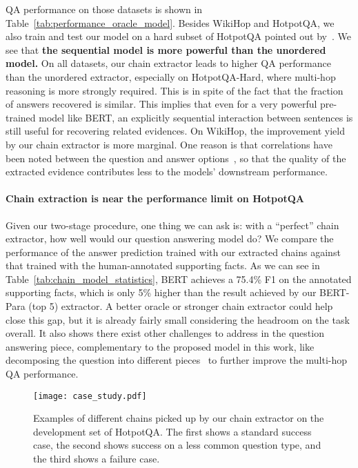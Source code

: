 \documentclass[11pt,a4paper]{article}
\begin{document}
QA performance on those datasets is shown in Table~\ref{tab:performance_oracle_model}. Besides WikiHop and HotpotQA, we also train and test our model on a hard subset of HotpotQA pointed out by~. We see that \textbf{the sequential model is more powerful than the unordered model.} On all datasets, our chain extractor leads to higher QA performance than the unordered extractor, especially on HotpotQA-Hard, where multi-hop reasoning is more strongly required. This is in spite of the fact that the fraction of answers recovered is similar. This implies that even for a very powerful pre-trained model like BERT, an explicitly sequential interaction between sentences is still useful for recovering related evidences. On WikiHop, the improvement yield by our chain extractor is more marginal. One reason is that correlations have been noted between the question and answer options~\citep{chen2019understanding}, so that the quality of the extracted evidence contributes less to the models' downstream performance. 










\paragraph{Chain extraction is near the performance limit on HotpotQA} Given our two-stage procedure, one thing we can ask is: with a ``perfect'' chain extractor, how well would our question answering model do? We compare the performance of the answer prediction trained with our extracted chains against that trained with the human-annotated supporting facts. As we can see in Table~\ref{tab:chain_model_statistics}, BERT achieves a 75.4\% F1 on the annotated supporting facts, which is only 5\% higher than the result achieved by our BERT-Para (top 5) extractor. A better oracle or stronger chain extractor could help close this gap, but it is already fairly small considering the headroom on the task overall. It also shows there exist other challenges to address in the question answering piece, complementary to the proposed model in this work, like decomposing the question into different pieces~\citep{MinZZH19} to further improve the multi-hop QA performance.

\begin{figure*}[t]
\centering
\texttt{[image: case\_study.pdf]}
\caption{Examples of different chains picked up by our chain extractor on the development set of HotpotQA. The first shows a standard success case, the second shows success on a less common question type, and the third shows a failure case.}
\vspace{-0.5cm}
    \label{fig:case_study}
\end{figure*}
\end{document}
